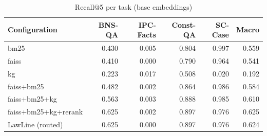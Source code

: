 \begin{table}
\caption{Recall@5 per task (base embeddings)}
\label{tab:per_task_base}
\begin{tabular}{lrrrrr}
\toprule
Configuration & BNS-QA & IPC-Facts & Const-QA & SC-Case & Macro \\
\midrule
bm25 & 0.430 & 0.005 & 0.804 & 0.997 & 0.559 \\
faiss & 0.410 & 0.000 & 0.790 & 0.964 & 0.541 \\
kg & 0.223 & 0.017 & 0.508 & 0.020 & 0.192 \\
faiss+bm25 & 0.482 & 0.002 & 0.864 & 0.986 & 0.584 \\
faiss+bm25+kg & 0.563 & 0.003 & 0.888 & 0.985 & 0.610 \\
faiss+bm25+kg+rerank & 0.625 & 0.002 & 0.897 & 0.976 & 0.625 \\
LawLine (routed) & 0.625 & 0.000 & 0.897 & 0.976 & 0.624 \\
\bottomrule
\end{tabular}
\end{table}
